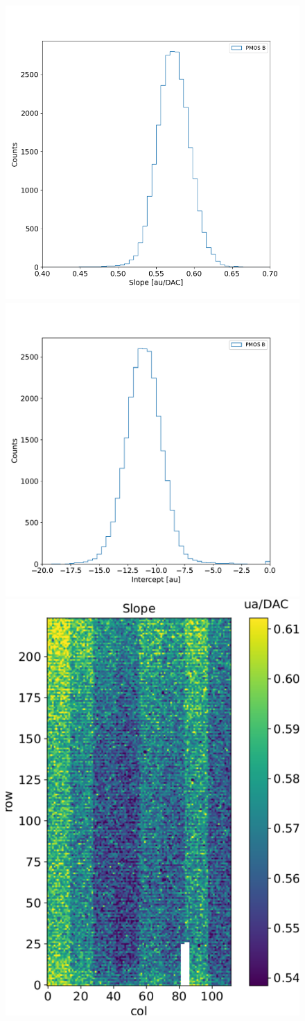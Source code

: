         \begin{figure}[h!]
            \centering
            \includegraphics[width=.49\linewidth]{figures/charaterization/slope_histogram.pdf}
            \includegraphics[width=.49\linewidth]{figures/charaterization/intercept_histogram.pdf}\\
            \includegraphics[width=.49\linewidth]{figures/charaterization/slope_map.pdf}

\end{figure}
